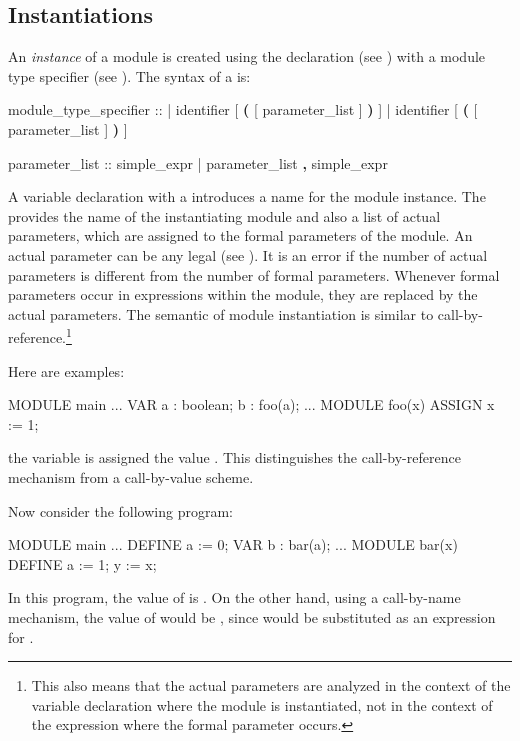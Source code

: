 \subsection { Instantiations}
\label{MODULE Instantiations}

An \emph{instance} of a module is created using the 
declaration (see ) with a module type specifier
(see ).
%
The syntax of a  is:

\begin{Grammar}
module_type_specifier ::     
      | identifier [ \textbf{(} [ parameter_list ] \textbf{)} ]
      |  identifier [ \textbf{(} [ parameter_list ] \textbf{)} ]

parameter_list ::
        simple_expr
      | parameter_list \textbf{,} simple_expr
\end{Grammar}
%
A variable declaration with a 
introduces a name for the module instance. 
%
The  provides the name of the
instantiating module and also a list of actual parameters, which are
assigned to the formal parameters of the module.
%
An actual parameter can be any legal  (see
). 
%
It is an error if the number of actual parameters is different from
the number of formal parameters. 
%
Whenever formal parameters occur in expressions within the module,
they are replaced by the actual parameters. 
%
The semantic of module instantiation is similar to
call-by-reference.\footnote{This also means that the actual parameters
are analyzed in the context of the variable declaration where the module
is instantiated, not in the context of the expression where the formal
parameter occurs.}

Here are examples:
%
\begin{nusmvCode}
MODULE main
...
 VAR
  a : boolean;
  b : foo(a);
...
MODULE foo(x)
 ASSIGN
   x := 1;
\end{nusmvCode}
%
the variable  is assigned the value . 
%
This distinguishes the call-by-reference mechanism from a
call-by-value scheme.

\noindent Now consider the following program:
%
\begin{nusmvCode}
MODULE main
...
 DEFINE
   a := 0;
 VAR
   b : bar(a);
...
MODULE bar(x)
 DEFINE
   a := 1;
   y := x;
\end{nusmvCode}
%
In this program, the value of  is . On the other hand,
using a call-by-name mechanism, the value of  would be
, since  would be substituted as an expression for
.


